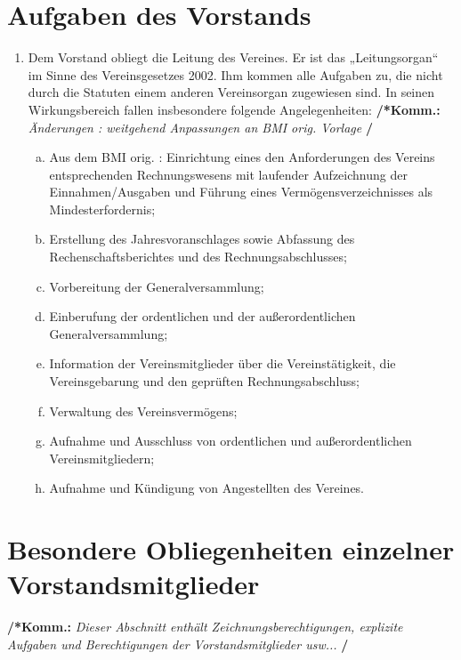 \documentclass[a4paper,12pt]{article}
\newcommand{\comment}[1]{{\bf /*Komm.:} \textit{#1} {\bf */}}
\begin{document}
\section{Aufgaben des Vorstands} %
\begin{enumerate}
\item Dem Vorstand obliegt die Leitung des Vereines. Er ist das „Leitungsorgan“ im Sinne des Vereinsgesetzes 2002. Ihm kommen alle Aufgaben zu, die nicht durch die Statuten einem anderen Vereinsorgan zugewiesen sind. In seinen Wirkungsbereich fallen insbesondere folgende Angelegenheiten:
\comment{Änderungen : weitgehend Anpassungen an BMI orig. Vorlage}
	\begin{enumerate}[(a)]
	\item Aus dem BMI orig. : Einrichtung eines den Anforderungen des Vereins entsprechenden Rechnungswesens mit laufender Aufzeichnung der Einnahmen/Ausgaben und Führung eines Vermögensverzeichnisses als Mindesterfordernis;
	\item Erstellung des Jahresvoranschlages sowie Abfassung des Rechenschaftsberichtes und des Rechnungsabschlusses;
	\item Vorbereitung der Generalversammlung;
	\item Einberufung der ordentlichen und der außerordentlichen Generalversammlung;
	\item Information der Vereinsmitglieder über die Vereinstätigkeit, die Vereinsgebarung und den geprüften Rechnungsabschluss;
	\item Verwaltung des Vereinsvermögens;
	\item Aufnahme und Ausschluss von ordentlichen und außerordentlichen Vereinsmitgliedern;
	\item Aufnahme und Kündigung von Angestellten des Vereines.
	\end{enumerate}
\end{enumerate}

\section{Besondere Obliegenheiten einzelner Vorstandsmitglieder} %
\comment{ Dieser Abschnitt enthält Zeichnungsberechtigungen, explizite Aufgaben und Berechtigungen der Vorstandsmitglieder usw... }
\end{document}
